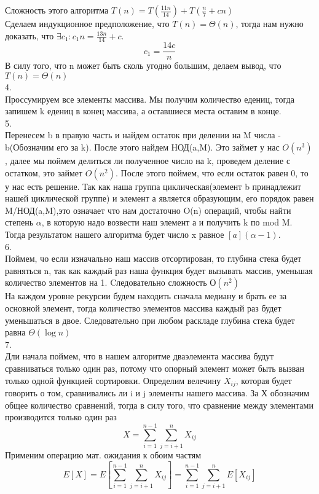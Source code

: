 \documentclass[a4paper,12pt]{article}
\begin{document}
Сложность этого алгоритма $T(n)=T(\frac{11n}{14})+T(\frac{n}{7}+cn)$\\
Сделаем индукционное предположение, что $T(n)=\Theta(n)$, тогда нам нужно доказать, что $\exists c_1: c_1n=\frac{13n}{14}+c$.\[c_1=\frac{14c}{n}\]
В силу того, что n может быть сколь угодно большим, делаем вывод, что $T(n)=\Theta(n)$\\
4.\\
Проссумируем все элементы массива. Мы получим количество едениц, тогда запишем k едениц в конец массива, а оставшиеся места оставим в конце.\\
5.\\
Перенесем b в правую часть и найдем остаток при делении на M числа -b(Обозначим его за k). После этого найдем НОД(a,M). Это займет у нас $O(n^3)$, далее мы поймем делиться ли полученное число на k, проведем деление с остатком, это займет $O(n^2)$. После этого поймем, что если остаток равен 0, то у нас есть решение. Так как наша группа циклическая(элемент b принадлежит нашей циклической группе) и элемент а является образующим, его порядок равен M/НОД(a,M),это означает что нам достаточно O(n) операций, чтобы найти степень $\alpha$, в которую надо возвести наш элемент а и получить k по mod M.  Тогда  результатом нашего алгоритма будет число x равное $[a](\alpha-1)$.\\
6.\\
Поймем, чо если изначально наш массив отсортирован, то глубина стека будет равняться n, так как каждый раз наша функция будет вызывать массив, уменьшая количество элементов на 1. Cледовательно сложность $О(n^2)$\\
На каждом уровне рекурсии будем находить сначала медиану и брать ее за основной элемент, тогда количество элементов массива каждый раз будет уменьшаться в двое. Следовательно при любом раскладе глубина стека будет равна $\Theta(\log n)$\\
7.\\
Дли начала поймем, что в нашем алгоритме дваэлемента массива будут сравниваться только один раз, потому что опорный элемент может быть вызван только  одной функцией сортировки. Определим велечину $X_{ij}$, которая будет говорить о том, сравнивались ли i и j элементы нашего массива. За Х обозначим общее количество сравнений, тогда в силу того, что сравнение между элементами производится только один раз
\[X=\sum_{i=1}^	{n-1} \sum_{j=i+1}^{n} X_{ij}\]
Применим операцию мат. ожидания к обоим частям
\[E[X]=E \left[ \sum_{i=1}^	{n-1} \sum_{j=i+1}^{n} X_{ij} \right] =   \sum_{i=1}^	{n-1} \sum_{j=i+1}^{n} E \left[X_{ij} \right] \]
\end{document}
